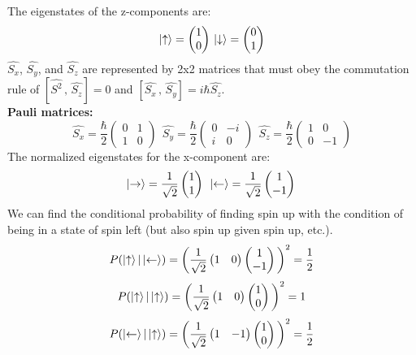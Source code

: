 The eigenstates of the z-components are:
\[\ket{\uparrow}=\begin{pmatrix}1\\0\end{pmatrix}\, \ket{\downarrow}=\begin{pmatrix}0\\1\end{pmatrix}\]
$\hat{S_x}$, $\hat{S_y}$, and $\hat{S_z}$ are represented by 2x2 matrices that must obey the commutation rule of $[\hat{S^2}\,,\,\hat{S_z}]=0$ and $[\hat{S_x}\,,\,\hat{S_y}]=i\hbar\hat{S_z}$.
\\
\textbf{Pauli matrices:}
\[
\hat{S_x}=\frac{\hbar}{2}\begin{pmatrix}0&1\\1&0\end{pmatrix}\;\,
\hat{S_y}=\frac{\hbar}{2}\begin{pmatrix}0&-i\\i&0\end{pmatrix}\;\,
\hat{S_z}=\frac{\hbar}{2}\begin{pmatrix}1&0\\0&-1\end{pmatrix}
\]
The normalized eigenstates for the x-component are:
\[
\ket{\rightarrow}=\frac{1}{\sqrt{2}}\begin{pmatrix}1\\1\end{pmatrix}\;\,
\ket{\leftarrow}=\frac{1}{\sqrt{2}}\begin{pmatrix}1\\-1\end{pmatrix}\,
\]
We can find the conditional probability of finding spin up with the condition of being in a state of spin left (but also spin up given spin up, etc.).
\[
P(\ket{\uparrow}|\ket{\leftarrow})=\bigg(\frac{1}{\sqrt{2}}\begin{pmatrix}1&0\end{pmatrix}\begin{pmatrix}1\\-1\end{pmatrix}\bigg)^2=\frac{1}{2}
\]
\[
P(\ket{\uparrow}|\ket{\uparrow})=\bigg(\frac{1}{\sqrt{2}}\begin{pmatrix}1&0\end{pmatrix}\begin{pmatrix}1\\0\end{pmatrix}\bigg)^2=1
\]
\[
P(\ket{\leftarrow}|\ket{\uparrow})=\bigg(\frac{1}{\sqrt{2}}\begin{pmatrix}1&-1\end{pmatrix}\begin{pmatrix}1\\0\end{pmatrix}\bigg)^2=\frac{1}{2}
\]
